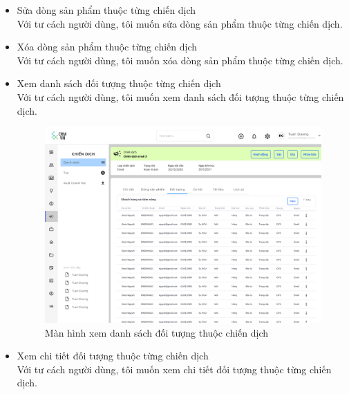 \documentclass[12pt,a4paper]{article}
\begin{document}
\begin{enumerate}
\begin{itemize}
            \item Sửa dòng sản phẩm thuộc từng chiến dịch \\
            Với tư cách người dùng, tôi muốn sửa dòng sản phẩm thuộc từng chiến dịch.
            \item Xóa dòng sản phẩm thuộc từng chiến dịch\\
            Với tư cách người dùng, tôi muốn xóa dòng sản phẩm thuộc từng chiến dịch.

            \item Xem danh sách đối tượng thuộc từng chiến dịch \\
            Với tư cách người dùng, tôi muốn xem danh sách đối tượng thuộc từng chiến dịch.

            \begin{figure}[H]
                \centering \includegraphics[width=\textwidth]{Img/Nguyet/Chiendich/dsdoituong.png}
                \vspace{0.5cm}
                \caption{Màn hình xem danh sách đối tượng thuộc chiến dịch }
                \label{doituongchiendich}
            \end{figure}


            \item Xem chi tiết đối tượng thuộc từng chiến dịch \\
            Với tư cách người dùng, tôi muốn xem chi tiết đối tượng thuộc từng chiến dịch.


\end{itemize}
\end{enumerate}
\end{document}
